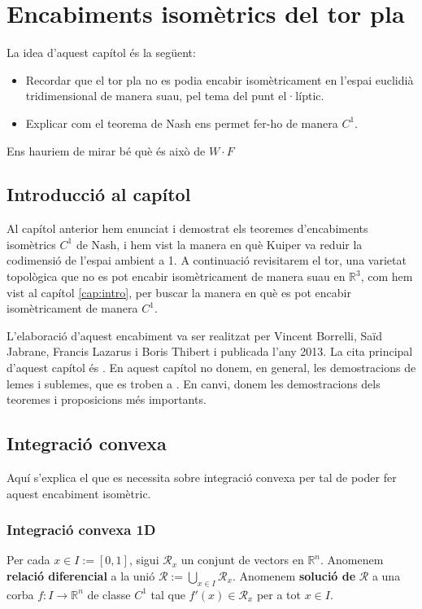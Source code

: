\chapter{Encabiments isomètrics del tor pla}
{\color{blue}La idea d'aquest capítol és la següent:
\begin{itemize}
    \item Recordar que el tor pla no es podia encabir isomètricament en l'espai euclidià tridimensional de manera suau, pel tema del punt el·líptic.
    \item Explicar com el teorema de Nash ens permet fer-ho de manera $C^1$.
\end{itemize}

Ens hauriem de mirar bé què és això de $W\cdot F$
}
\section{Introducció al capítol}
Al capítol anterior hem enunciat i demostrat els teoremes d'encabiments isomètrics $C^1$ de Nash, i hem vist la manera en què Kuiper va reduir la codimensió de l'espai ambient a 1. A continuació revisitarem el tor, una varietat topològica que no es pot encabir isomètricament de manera suau en $\mathbb R^3$, com hem vist al capítol \ref{cap:intro}, per buscar la manera en què es pot encabir isomètricament de manera $C^1$.

L'elaboració d'aquest encabiment va ser realitzat per Vincent Borrelli, Saïd Jabrane, Francis Lazarus i Boris Thibert i publicada l'any 2013. La cita principal d'aquest capítol és \cite{borrelli2013}. En aquest capítol no donem, en general, les demostracions de lemes i sublemes, que es troben a \cite{borrelli2013}. En canvi, donem les demostracions dels teoremes i proposicions més importants.

\section{Integració convexa}
{\color{blue}Aquí s'explica el que es necessita sobre integració convexa per tal de poder fer aquest encabiment isomètric.}
\subsection{Integració convexa 1D}
\begin{defi}
    Per cada $x\in I := [0,1]$, sigui $\mathcal R_x$ un conjunt de vectors en $\mathbb R^n$. Anomenem \textbf{relació diferencial} a la unió $\mathcal R := \bigcup_{x\in I} \mathcal R_x$. Anomenem \textbf{solució de} $\mathcal R$ a una corba $f:I\to\mathbb R^n$ de classe $C^1$ tal que $f'(x)\in\mathcal R_x$ per a tot $x\in I$.
\end{defi}

